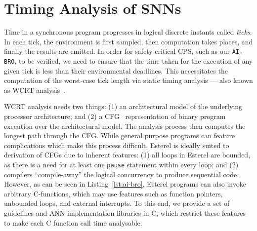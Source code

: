\section{Timing Analysis of \acfp{SNN}}
\label{sec:wcrt}

Time in a synchronous program progresses in logical discrete instants called \emph{ticks}. 
In each tick, the environment is first sampled, then computation takes places, and finally the results are emitted.
In order for safety-critical \ac{CPS}, such as our \texttt{AI-BRO}, to be verified, we need to ensure that the time taken for the execution of any given tick is less than their environmental deadlines.
This necessitates the computation of the worst-case tick length via static timing analysis --- also known as \acf{WCRT} analysis~\cite{roop2009tight}.

\ac{WCRT} analysis needs two things: (1) an architectural model of the
underlying processor architecture; and (2) a \acf{CFG}~\cite{wilhelm2008worst}  representation of
binary program execution over the architectural model. The analysis
process then computes the longest path through the \ac{CFG}.
While general purpose programs can feature complications which make this process difficult, Esterel is ideally suited to derivation of \acp{CFG} due to inherent features:  (1) all loops in Esterel are bounded, as there is a need for at least one \texttt{pause} statement
within every loop; and (2) compilers ``compile-away'' the logical
concurrency to produce sequential code. However, as can be seen in
Listing~\ref{lst:ai-bro}, 
Esterel programs can also invoke arbitrary C-functions, which may use
features such as function pointers, unbounded loops, and external interrupts. 
To this end, we provide a set of guidelines and \ac{ANN}
implementation libraries in C,
which restrict these features to make each C function call time
analysable. 

